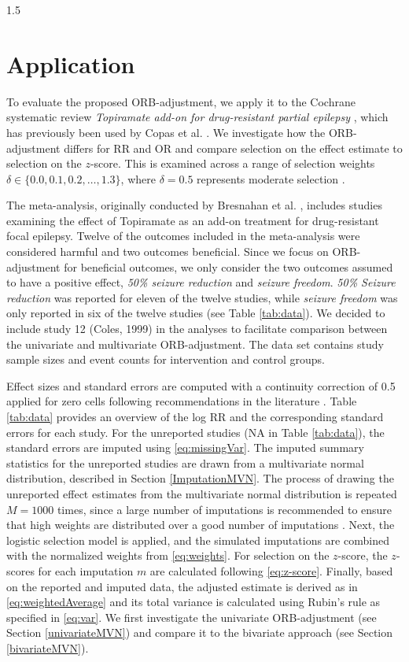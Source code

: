 \documentclass{article}
\begin{document}
\begin{spacing}{1.5}
\section{Application}
\label{application}

To evaluate the proposed ORB-adjustment, we apply it to the Cochrane systematic review \textit{Topiramate add-on for drug-resistant partial epilepsy} \cite{pulman2014topiramate}, which has previously been used by Copas et al. \cite{copas2019model}. We investigate how the ORB-adjustment differs for RR and OR and compare selection on the effect estimate to selection on the $z$-score. This is examined across a range of selection weights $\delta \in \{0.0, 0.1, 0.2, \ldots, 1.3\}$, where $\delta = 0.5$ represents moderate selection \cite{carpenter2011assessing}. 

The meta-analysis, originally conducted by Bresnahan et al. \cite{bresnahan2019topiramate}, includes studies examining the effect of Topiramate as an add-on treatment for drug-resistant focal epilepsy.  Twelve of the outcomes included in the meta-analysis were considered harmful and two outcomes beneficial. Since we focus on ORB-adjustment for beneficial outcomes, we only consider the two outcomes assumed to have a positive effect, \ie \textit{50\% seizure reduction} and \textit{seizure freedom}. \textit{50\% Seizure reduction} was reported for eleven of the twelve studies, while \textit{seizure freedom} was only reported in six of the twelve studies (see Table \ref{tab:data}). We decided to include study 12 (Coles, 1999) in the analyses to facilitate comparison between the univariate and multivariate ORB-adjustment. The data set contains study sample sizes and event counts for intervention and control groups. 

Effect sizes and standard errors are computed with a continuity correction of 0.5 applied for zero cells following recommendations in the literature \cite{copas2019model, agresti2013categorical}. Table \ref{tab:data} provides an overview of the log RR and the corresponding standard errors for each study. For the unreported studies (NA in Table \ref{tab:data}), the standard errors are imputed using \eqref{eq:missingVar}. The imputed summary statistics for the unreported studies are drawn from a multivariate normal distribution, described in Section \ref{ImputationMVN}. The process of drawing the unreported effect estimates from the multivariate normal distribution is repeated $M = 1000$ times, since a large number of imputations is recommended to ensure that high weights are distributed over a good number of imputations \cite{carpenter2011assessing}. Next, the logistic selection model is applied, and the simulated imputations are combined with the normalized weights from \eqref{eq:weights}. For selection on the $z$-score, the $z$-scores for each imputation $m$ are calculated following \eqref{eq:z-score}. Finally, based on the reported and imputed data, the adjusted estimate is derived as in \eqref{eq:weightedAverage} and its total variance is calculated using Rubin's rule as specified in \eqref{eq:var}. We first investigate the univariate ORB-adjustment (see Section \ref{univariateMVN}) and compare it to the bivariate approach (see Section \ref{bivariateMVN}).


\end{spacing}
\end{document}
